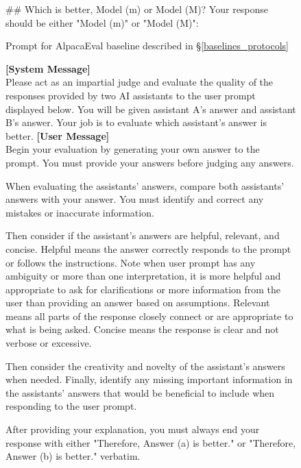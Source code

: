 \begin{figure*}[t!]
\begin{tcolorbox}[colback=black!3!white, colframe=black!70!white, title=AlpacaEval, fontupper=\footnotesize, fonttitle=\footnotesize]
\#\# Which is better, Model (m) or Model (M)? Your response should be either "Model (m)" or "Model (M)":
\end{tcolorbox}
\caption{Prompt for AlpacaEval baseline described in \S\ref{baselines_protocols}}
\label{fig:prompt_alpaca}
\end{figure*}



\begin{figure*}[t!]
\begin{tcolorbox}[colback=black!3!white, colframe=black!70!white, title=ArenaHard, fontupper=\footnotesize, fonttitle=\footnotesize]
\textbf{[System Message]} \\
Please act as an impartial judge and evaluate the quality of the responses provided by two AI assistants to the user prompt displayed below. You will be given assistant A's answer and assistant B's answer. Your job is to evaluate which assistant's answer is better.
\newline
\textbf{[User Message]}\\
Begin your evaluation by generating your own answer to the prompt. You must provide your answers before judging any answers.
\newline

When evaluating the assistants' answers, compare both assistants' answers with your answer. You must identify and correct any mistakes or inaccurate information.
\newline


Then consider if the assistant's answers are helpful, relevant, and concise. Helpful means the answer correctly responds to the prompt or follows the instructions. Note when user prompt has any ambiguity or more than one interpretation, it is more helpful and appropriate to ask for clarifications or more information from the user than providing an answer based on assumptions. Relevant means all parts of the response closely connect or are appropriate to what is being asked. Concise means the response is clear and not verbose or excessive.
\newline

Then consider the creativity and novelty of the assistant's answers when needed. Finally, identify any missing important information in the assistants' answers that would be beneficial to include when responding to the user prompt.
\newline

After providing your explanation, you must always end your response with either "Therefore, Answer (a) is better." or "Therefore, Answer (b) is better." verbatim.
\newline
\newline


\end{tcolorbox}
\end{figure*}

